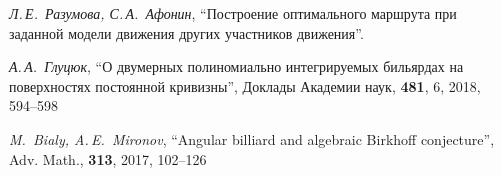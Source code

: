 \documentclass[12pt, a4paper]{article}
\begin{document}
    \newpage
\begin{thebibliography}{0}
	

	 \textit{Л.\,Е.~Разумова, С.\,А.~Афонин},  ``Построение оптимального маршрута при заданной модели движения других участников движения''.
	
	 \textit{А.\,А.~Глуцюк}, ``О двумерных полиномиально интегрируемых бильярдах на поверхностях постоянной кривизны'', Доклады Академии наук, \textbf{481}, 6, 2018, 594--598
	
	 \textit{M.~Bialy, A.\,E.~Mironov}, ``Angular billiard and algebraic Birkhoff conjecture'', Adv. Math., \textbf{313}, 2017, 102--126
	
\end{thebibliography} 
\end{document}
